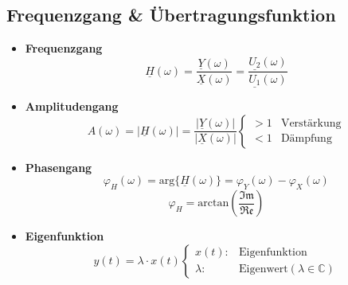 \subsection{Frequenzgang \& \"Ubertragungsfunktion}
\begin{mdframed}[style=exercise]
  \begin{itemize}
      \item{\textbf{Frequenzgang}}\\
          \[
              \underline{H}(\omega) =
              \frac{\underline{Y}(\omega)}{\underline{X}(\omega)} =
              \frac{\underline{U_2}(\omega)}{\underline{U_1}(\omega)}
          \]
      \item{\textbf{Amplitudengang}}\\
          \[
              A(\omega) = |\underline{H}(\omega)| =
              \frac{|\underline{Y}(\omega)|}{|\underline{X}(\omega)|}
              \begin{cases}
                  > 1 & \text{Verst\"arkung}\\
                  < 1 & \text{D\"ampfung}
              \end{cases}
          \]
      \item{\textbf{Phasengang}}\\
          \[
              \varphi_H(\omega) = \text{arg}\{\underline{H}(\omega)\} =
              \varphi_Y(\omega) - \varphi_X(\omega)
          \]
          \[
              \varphi_H = \text{arctan}(\frac{\mathfrak{Im}}{\mathfrak{Re}})
          \]
      \item{\textbf{Eigenfunktion}}\\
          \[
              y(t) = \lambda\cdot x(t)
              \begin{cases}
                  x(t): & \text{Eigenfunktion}\\
                  \lambda: & \text{Eigenwert}(\lambda\in\mathbb{C})
              \end{cases}
          \]
  \end{itemize}
\end{mdframed}
